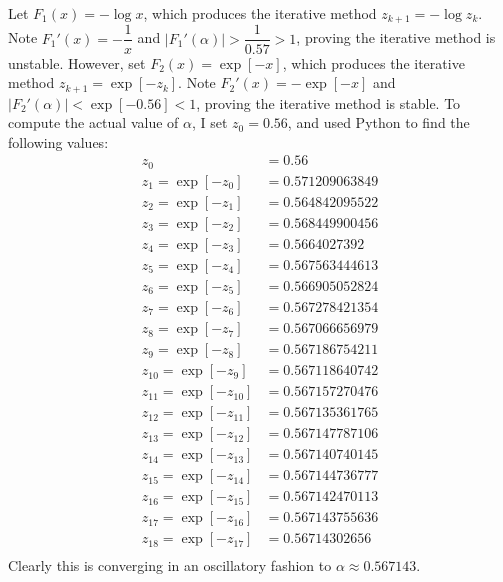 \documentclass[12pt]{article}
\begin{document}
\noindent Let $F_1(x) = -\log{x}$, which produces the iterative method $z_{k+1} = -\log{z_k}$.  Note $F_1'(x) = -\dfrac{1}{x}$ and $|F_1'(\alpha)| > \dfrac{1}{0.57} > 1$, proving the iterative method is unstable.  However, set $F_2(x) = \exp{[-x]}$, which produces the iterative method $z_{k+1} = \exp[-z_k]$.  Note $F_2'(x) = -\exp{[-x]}$ and $|F_2'(\alpha)| < \exp{[-0.56]} < 1$, proving the iterative method is stable.  To compute the actual value of $\alpha$, I set $z_0 = 0.56$, and used Python to find the following values:
\begin{align*}
z_0 &= 0.56 \\
z_1 = \exp{[-z_0]} &= 0.571209063849 \\
z_2 = \exp{[-z_1]} &= 0.564842095522 \\
z_3 = \exp{[-z_2]} &= 0.568449900456 \\
z_4 = \exp{[-z_3]} &= 0.5664027392 \\
z_5 = \exp{[-z_4]} &= 0.567563444613 \\
z_6 = \exp{[-z_5]} &= 0.566905052824 \\
z_7 = \exp{[-z_6]} &= 0.567278421354 \\
z_8 = \exp{[-z_7]} &= 0.567066656979 \\
z_9 = \exp{[-z_8]} &= 0.567186754211 \\
z_{10} = \exp{[-z_9]} &= 0.567118640742 \\
z_{11} = \exp{[-z_{10}]} &= 0.567157270476 \\
z_{12} = \exp{[-z_{11}]} &= 0.567135361765 \\
z_{13} = \exp{[-z_{12}]} &= 0.567147787106 \\
z_{14} = \exp{[-z_{13}]} &= 0.567140740145 \\
z_{15} = \exp{[-z_{14}]} &= 0.567144736777 \\
z_{16} = \exp{[-z_{15}]} &= 0.567142470113 \\
z_{17} = \exp{[-z_{16}]} &= 0.567143755636 \\
z_{18} = \exp{[-z_{17}]} &= 0.56714302656 \\
\end{align*}
Clearly this is converging in an oscillatory fashion to $\boxed{\alpha \approx 0.567143}$.
\end{document}
